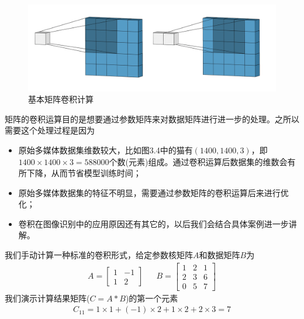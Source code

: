 \documentclass[12pt]{article}
\numberwithin{equation}{section}
\numberwithin{figure}{section}
\begin{document}
\begin{figure}[H]
	\centering
	\includegraphics[width=\textwidth]{fig/mtconvo}
	\caption{基本矩阵卷积计算}
\end{figure}

\begin{remark}
	矩阵的卷积运算目的是想要通过参数矩阵来对数据矩阵进行进一步的处理。之所以需要这个处理过程是因为
	\begin{itemize}
		\item 原始多媒体数据集维数较大，比如图3.4中的猫有$(1400, 1400, 3)$，即$1400 \times 1400 \times 3 = 588000$个数(元素)组成。通过卷积运算后数据集的维数会有所下降，从而节省模型训练时间；
		\item 原始多媒体数据集的特征不明显，需要通过参数矩阵的卷积运算后来进行优化；
		\item 卷积在图像识别中的应用原因还有其它的，以后我们会结合具体案例进一步讲解。
	\end{itemize}
\end{remark}

\begin{example}
我们手动计算一种标准的卷积形式，给定参数核矩阵$A$和数据矩阵$B$为
\begin{align*}
	A = \begin{bmatrix}
		1 & -1 \\
		1 & 2 
	\end{bmatrix} & & B= \begin{bmatrix}
		1 & 2 & 1 \\
		2 & 3 & 6 \\
		0 & 5 & 7 
	\end{bmatrix}
\end{align*}	
我们演示计算结果矩阵($C = A*B$)的第一个元素
\begin{align*}
	C_{11} = 1\times 1 + (-1) \times 2 + 1 \times 2 + 2 \times 3 = 7 
\end{align*}
\end{example}
\end{document}
